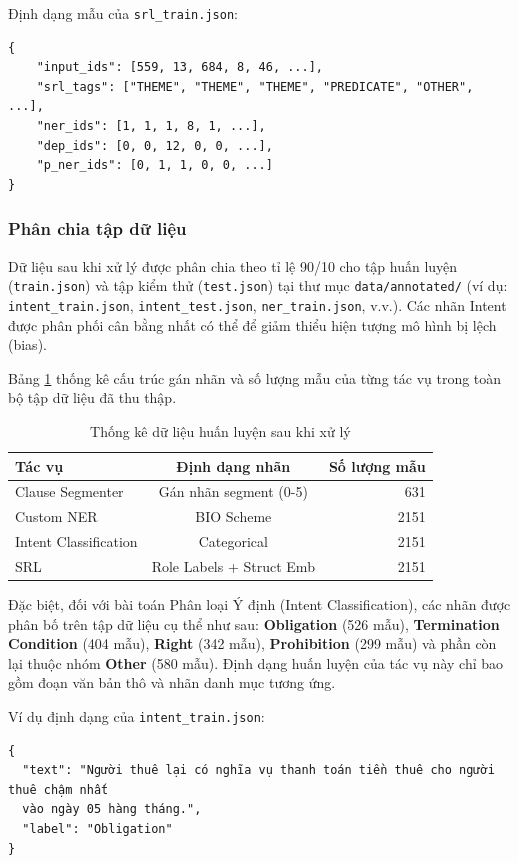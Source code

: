 Định dạng mẫu của \texttt{srl\_train.json}:
\begin{verbatim}
{
    "input_ids": [559, 13, 684, 8, 46, ...],
    "srl_tags": ["THEME", "THEME", "THEME", "PREDICATE", "OTHER", ...],
    "ner_ids": [1, 1, 1, 8, 1, ...],
    "dep_ids": [0, 0, 12, 0, 0, ...],
    "p_ner_ids": [0, 1, 1, 0, 0, ...]
}
\end{verbatim}


\subsubsection{Phân chia tập dữ liệu}
Dữ liệu sau khi xử lý được phân chia theo tỉ lệ 90/10 cho tập huấn luyện (\texttt{train.json}) và tập kiểm thử (\texttt{test.json}) tại thư mục \texttt{data/annotated/} (ví dụ: \texttt{intent\_train.json}, \texttt{intent\_test.json}, \texttt{ner\_train.json}, v.v.). Các nhãn Intent được phân phối cân bằng nhất có thể để giảm thiểu hiện tượng mô hình bị lệch (bias).

Bảng \ref{tab:data_stats} thống kê cấu trúc gán nhãn và số lượng mẫu của từng tác vụ trong toàn bộ tập dữ liệu đã thu thập. 

\begin{table}[H]
\centering
\caption{Thống kê dữ liệu huấn luyện sau khi xử lý}
\label{tab:data_stats}
\begin{tabular}{|l|c|r|}
\hline
\textbf{Tác vụ} & \textbf{Định dạng nhãn} & \textbf{Số lượng mẫu} \\ \hline
Clause Segmenter & Gán nhãn segment (0-5) & 631 \\ \hline
Custom NER & BIO Scheme & 2151 \\ \hline
Intent Classification & Categorical & 2151 \\ \hline
SRL & Role Labels + Struct Emb & 2151 \\ \hline
\end{tabular}
\end{table}

Đặc biệt, đối với bài toán Phân loại Ý định (Intent Classification), các nhãn được phân bố trên tập dữ liệu cụ thể như sau: \textbf{Obligation} (526 mẫu), \textbf{Termination Condition} (404 mẫu), \textbf{Right} (342 mẫu), \textbf{Prohibition} (299 mẫu) và phần còn lại thuộc nhóm \textbf{Other} (580 mẫu). Định dạng huấn luyện của tác vụ này chỉ bao gồm đoạn văn bản thô và nhãn danh mục tương ứng.

Ví dụ định dạng của \texttt{intent\_train.json}:
\begin{verbatim}
{
  "text": "Người thuê lại có nghĩa vụ thanh toán tiền thuê cho người thuê chậm nhất 
  vào ngày 05 hàng tháng.",
  "label": "Obligation"
}
\end{verbatim}